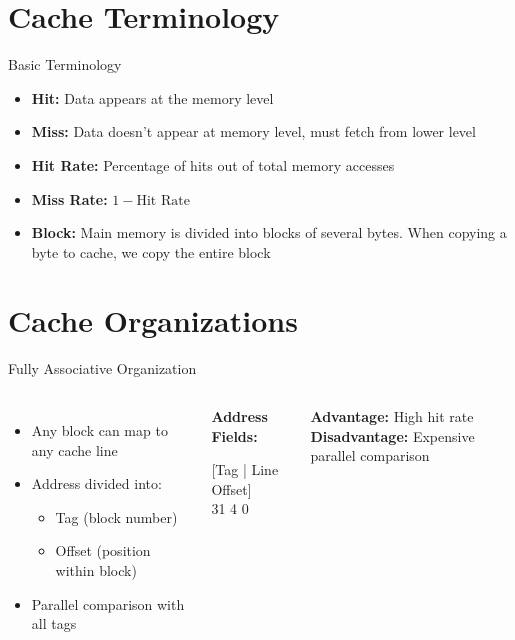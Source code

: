 \documentclass[aspectratio=169,12pt]{beamer}
\begin{document}
\section{Cache Terminology}
\begin{frame}{Basic Terminology}
\begin{itemize}
    \item \textbf{Hit:} Data appears at the memory level
    \item \textbf{Miss:} Data doesn't appear at memory level, must fetch from lower level
    \item \textbf{Hit Rate:} Percentage of hits out of total memory accesses
    \item \textbf{Miss Rate:} $1 - \text{Hit Rate}$
    \item \textbf{Block:} Main memory is divided into blocks of several bytes. When copying a byte to cache, we copy the entire block
\end{itemize}
\end{frame}

\section{Cache Organizations}
\begin{frame}{Fully Associative Organization}
\begin{columns}
\begin{itemize}
    \item Any block can map to any cache line
    \item Address divided into:
    \begin{itemize}
        \item Tag (block number)
        \item Offset (position within block)
    \end{itemize}
    \item Parallel comparison with all tags
\end{itemize}

\begin{tcolorbox}[colback=gray!10]
\textbf{Address Fields:}\\
\begin{center}
[Tag | Line Offset]\\
31 \hspace{2cm} 4 \hspace{0.5cm} 0
\end{center}
\end{tcolorbox}

\textbf{Advantage:} High hit rate\\
\textbf{Disadvantage:} Expensive parallel comparison
\end{columns}
\end{frame}
\end{document}
